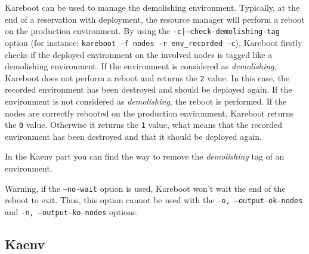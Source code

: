 \documentclass[a4wide,10pt,oneside]{book}
\begin{document}
Kareboot can be used to manage the demolishing environment. Typically, at the end of a reservation with deployment, the resource manager will perform a reboot on the production environment. By using the \texttt{-c|--check-demolishing-tag} option (for instance: \texttt{kareboot -f nodes -r env\_recorded -c}), Kareboot firstly checks if the deployed environment on the involved nodes is tagged like a demolishing environment. If the environment is considered as \textit{demolishing}, Kareboot does not perform a reboot and returns the \texttt{2} value. In this case, the recorded environment has been destroyed and should be deployed again. If the environment is not considered as \textit{demolishing}, the reboot is performed. If the nodes are correctly rebooted on the production environment, Kareboot returns the \texttt{0} value. Otherwise it returns the \texttt{1} value, what means that the recorded environment has been destroyed and that it should be deployed again.

In the Kaenv part you can find the way to remove the \textit{demolishing} tag of an environment.

Warning, if the \texttt{--no-wait} option is used, Kareboot won't wait the end of the reboot to exit. Thus, this option cannot be used with the \texttt{-o, --output-ok-nodes} and \texttt{-n, --output-ko-nodes} options.


\subsection{Kaenv}\label{sec:kaenv}
\end{document}
